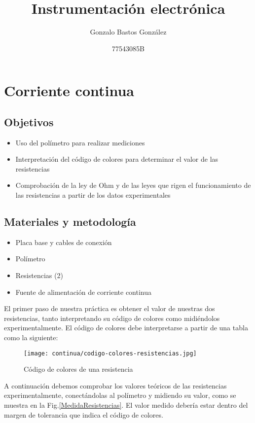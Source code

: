\documentclass[a4paper,12pt,titlepage]{article}
\title{Instrumentación electrónica}
\author{Gonzalo Bastos González}
\date{77543085B}
\begin{document}
\maketitle

\tableofcontents
\newpage

\section{Corriente continua}
\subsection{Objetivos}
    \begin{itemize}
        \item Uso del polímetro para realizar mediciones
        \item Interpretación del código de colores para determinar el valor de las resistencias
        \item Comprobación de la ley de Ohm y de las leyes que rigen el funcionamiento de las resistencias a partir de los datos experimentales
    \end{itemize}

\subsection{Materiales y metodología}
    \begin{itemize}
        \item Placa base y cables de conexión
        \item Polímetro
        \item Resistencias (2)
        \item Fuente de alimentación de corriente continua
    \end{itemize}

El primer paso de nuestra práctica es obtener el valor de nuestras dos resistencias, tanto interpretando su código de colores como midiéndolos experimentalmente. El código de colores debe interpretarse a partir de una tabla como la siguiente:

\begin{figure}[h!]
    \centering
    \texttt{[image: continua/codigo-colores-resistencias.jpg]}
    \caption{Código de colores de una resistencia}
    \label{Codigo de colores}
\end{figure}
\newpage
A continuación debemos comprobar los valores teóricos de las resistencias experimentalmente, conectándolas al polímetro y midiendo su valor, como se muestra en la Fig.\ref{MedidaResistencias}. El valor medido debería estar dentro del margen de tolerancia que indica el código de colores.
\end{document}
